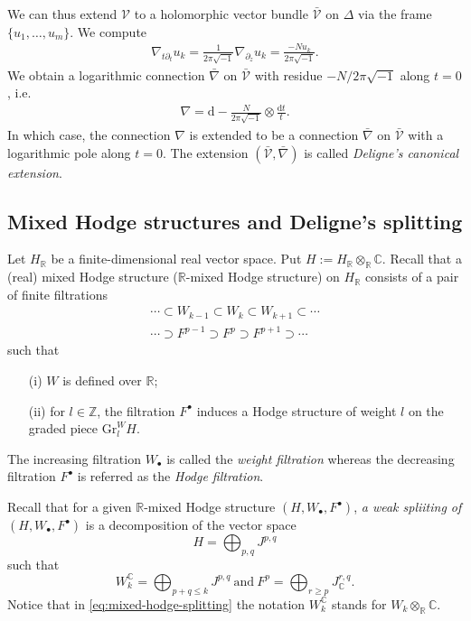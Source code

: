 We can thus extend \(\mathcal{V}\)
to a holomorphic vector bundle 
\(\bar{\mathcal{V}}\) on \(\Delta\) via the frame \(\{u_{1},\ldots,u_{m}\}\). 
We compute 
\begin{eqnarray*}
\nabla_{t\partial_{t}} u_{k} = \frac{1}{2\pi\sqrt{-1}}
\nabla_{\partial_{z}} u_{k} = \frac{-N u_{k}}{2\pi\sqrt{-1}}.
\end{eqnarray*}
We obtain a logarithmic connection \(\bar{\nabla}\) on \(\bar{\mathcal{V}}\)
with residue \(-N\slash 2\pi\sqrt{-1}\) along \(t=0\), i.e.
\begin{eqnarray*}
\nabla = \mathrm{d} - \frac{N}{2\pi\sqrt{-1}}\otimes\frac{\mathrm{d}t}{t}.
\end{eqnarray*}
In which case, the connection \(\nabla\)
is extended to be a connection \(\bar{\nabla}\)
on \(\bar{\mathcal{V}}\)
with a logarithmic pole along \(t=0\).
The extension \((\bar{\mathcal{V}},\bar{\nabla})\)
is called \emph{Deligne's canonical extension}.

\subsection{Mixed Hodge structures and Deligne's splitting}
Let \(H_{\mathbb{R}}\) be a finite-dimensional real vector space. 
Put \(H:=H_{\mathbb{R}}\otimes_{\mathbb{R}}\mathbb{C}\).
Recall that a (real) mixed Hodge structure (\(\mathbb{R}\)-mixed Hodge structure)
on \(H_{\mathbb{R}}\)
consists of a pair of finite filtrations
\begin{align*}
\cdots\subset W_{k-1}\subset W_{k}\subset W_{k+1}\subset\cdots\\
\cdots\supset F^{p-1}\supset F^{p}\supset F^{p+1}\supset\cdots
\end{align*}
such that
\begin{itemize}
\item[(i)] \(W\) is defined over \(\mathbb{R}\);
\item[(ii)] for \(l\in\mathbb{Z}\), the filtration \(F^{\bullet}\) induces
a Hodge structure of weight \(l\)
on the graded piece \(\mathrm{Gr}_{l}^{W}H\).
\end{itemize}
The increasing filtration \(W_{\bullet}\) is called the \emph{weight filtration}
whereas the decreasing filtration \(F^{\bullet}\) is referred as the \emph{Hodge filtration}.

Recall that for a given \(\mathbb{R}\)-mixed Hodge structure 
\((H,W_{\bullet},F^{\bullet})\),
\emph{a weak spliiting of \((H,W_{\bullet},F^{\bullet})\)} is a decomposition 
of the vector space
\begin{equation}
H = \bigoplus_{p,q} J^{p,q}
\end{equation}
such that
\begin{equation}
\label{eq:mixed-hodge-splitting}
W^{\mathbb{C}}_{k} = \bigoplus_{p+q\le k} J^{p,q}~\mbox{and}~F^{p}=\bigoplus_{r\ge p} J^{r,q}_{\mathbb{C}}.
\end{equation}
Notice that in \eqref{eq:mixed-hodge-splitting} the
notation \(W^{\mathbb{C}}_{k}\) stands for
\(W_{k}\otimes_{\mathbb{R}}\mathbb{C}\).

